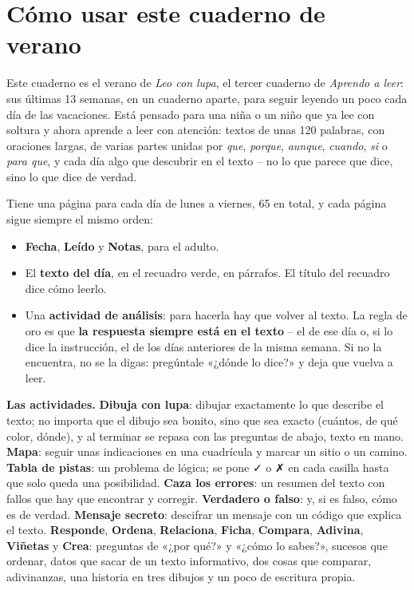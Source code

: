 \section*{Cómo usar este cuaderno de verano}

Este cuaderno es el verano de \textit{Leo con lupa}, el tercer cuaderno
de \textit{Aprendo a leer}: sus últimas 13 semanas, en un cuaderno
aparte, para seguir leyendo un poco cada día de las vacaciones. Está
pensado para una niña o un niño que ya lee con soltura y ahora aprende a
leer con atención: textos de unas 120 palabras, con oraciones largas,
de varias partes unidas por \textit{que}, \textit{porque},
\textit{aunque}, \textit{cuando}, \textit{si} o \textit{para que}, y
cada día algo que descubrir en el texto -- no lo que parece que dice,
sino lo que dice de verdad.

Tiene una página para cada día de lunes a viernes, 65 en total, y cada
página sigue siempre el mismo orden:

\begin{itemize}[leftmargin=6mm, itemsep=1mm]
\item \textbf{Fecha}, \textbf{Leído} y \textbf{Notas}, para el adulto.
\item El \textbf{texto del día}, en el recuadro verde, en párrafos. El
  título del recuadro dice cómo leerlo.
\item Una \textbf{actividad de análisis}: para hacerla hay que volver al
  texto. La regla de oro es que \textbf{la respuesta siempre está en el
  texto} -- el de ese día o, si lo dice la instrucción, el de los días
  anteriores de la misma semana. Si no la encuentra, no se la digas:
  pregúntale «¿dónde lo dice?» y deja que vuelva a leer.
\end{itemize}

\textbf{Las actividades.} \textbf{Dibuja con lupa}: dibujar exactamente
lo que describe el texto; no importa que el dibujo sea bonito, sino que
sea exacto (cuántos, de qué color, dónde), y al terminar se repasa con
las preguntas de abajo, texto en mano. \textbf{Mapa}: seguir unas
indicaciones en una cuadrícula y marcar un sitio o un camino.
\textbf{Tabla de pistas}: un problema de lógica; se pone ✓ o ✗ en cada
casilla hasta que solo queda una posibilidad. \textbf{Caza los
errores}: un resumen del texto con fallos que hay que encontrar y
corregir. \textbf{Verdadero o falso}: y, si es falso, cómo es de verdad.
\textbf{Mensaje secreto}: descifrar un mensaje con un código que explica
el texto. \textbf{Responde}, \textbf{Ordena}, \textbf{Relaciona},
\textbf{Ficha}, \textbf{Compara}, \textbf{Adivina}, \textbf{Viñetas} y
\textbf{Crea}: preguntas de «¿por qué?» y «¿cómo lo sabes?», sucesos que
ordenar, datos que sacar de un texto informativo, dos cosas que
comparar, adivinanzas, una historia en tres dibujos y un poco de
escritura propia.

